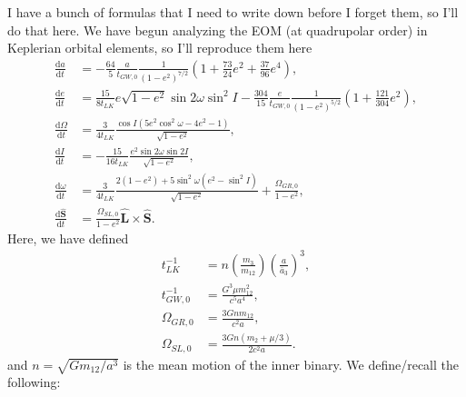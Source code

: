 \documentclass[11pt,
        usenames, %
        dvipsnames %
    ]{article}
\newcommand*{\rd}[2]{\frac{\mathrm{d}#1}{\mathrm{d}#2}}
\newcommand*{\bm}[1]{\boldsymbol{\mathbf{#1}}}
\newcommand*{\p}[1]{\left(#1\right)}
\begin{document}
I have a bunch of formulas that I need to write down before I forget them, so
I'll do that here. We have begun analyzing the EOM (at quadrupolar order) in
Keplerian orbital elements, so I'll reproduce them here
\begin{align}
    \rd{a}{t} &= -\frac{64}{5}\frac{a}{t_{GW,0}} \frac{1}{\p{1 - e^2}^{7/2}}
        \p{1 + \frac{73}{24}e^2 + \frac{37}{96}e^4},\\
    \rd{e}{t} &= \frac{15}{8t_{LK}} e\sqrt{1 - e^2}\sin 2\omega
        \sin^2 I - \frac{304}{15}\frac{e}{t_{GW, 0}}\frac{1}{\p{1 - e^2}^{5/2}}
            \p{1 + \frac{121}{304}e^2},\\
    \rd{\Omega}{t} &= \frac{3}{4t_{LK}}
        \frac{\cos I\p{5e^2 \cos^2\omega - 4e^2 - 1}}{\sqrt{1 - e^2}},\\
    \rd{I}{t} &= -\frac{15}{16t_{LK}}\frac{e^2\sin 2\omega \sin 2I}{
        \sqrt{1 - e^2}},\\
    \rd{\omega}{t} &= \frac{3}{4t_{LK}}
        \frac{2\p{1 - e^2} + 5\sin^2\omega
            (e^2 - \sin^2 I)}{\sqrt{1 - e^2}} + \frac{\Omega_{GR,0}}{1 - e^2},\\
    \rd{\hat{\bm{S}}}{t} &= \frac{\Omega_{SL,0}}{1 - e^2}\hat{\bm{L}} \times \hat{\bm{S}}.
\end{align}
Here, we have defined
\begin{align}
    t_{LK}^{-1} &= n\p{\frac{m_3}{m_{12}}}\p{\frac{a}{\bar{a}_3}}^3,\\
    t_{GW,0}^{-1} &= \frac{G^3 \mu m_{12}^2}{c^5a^4},\\
    \Omega_{GR,0} &= \frac{3Gnm_{12}}{c^2a},\\
    \Omega_{SL,0} &= \frac{3Gn\p{m_2 + \mu/3}}{2c^2a}.
\end{align}
and $n = \sqrt{Gm_{12}/a^3}$ is the mean motion of the inner binary. We
define/recall the following:
\end{document}
